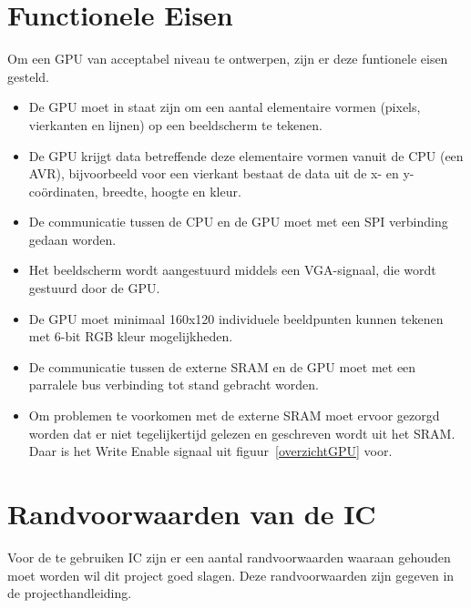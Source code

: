 \documentclass{scrartcl} %
\begin{document}
\section {Functionele Eisen}
Om een GPU van acceptabel niveau te ontwerpen, zijn er deze funtionele eisen gesteld.
\begin {itemize}
\item De GPU moet in staat zijn om een aantal elementaire vormen (pixels, vierkanten en lijnen) op een beeldscherm te tekenen.
\item De GPU krijgt data betreffende deze elementaire vormen vanuit de CPU (een AVR), bijvoorbeeld voor een vierkant bestaat de data uit de x- en y-coördinaten, breedte, hoogte en kleur.
\item De communicatie tussen de CPU en de GPU moet met een SPI verbinding gedaan worden.
\item Het beeldscherm wordt aangestuurd middels een VGA-signaal, die wordt gestuurd door de GPU.
\item De GPU moet minimaal 160x120 individuele beeldpunten kunnen tekenen met 6-bit RGB kleur mogelijkheden.
\item De communicatie tussen de externe SRAM en de GPU moet met een parralele bus verbinding tot stand gebracht worden.
\item Om problemen te voorkomen met de externe SRAM moet ervoor gezorgd worden dat er niet tegelijkertijd gelezen en geschreven wordt uit het SRAM. Daar is het Write Enable signaal uit figuur~\ref{overzichtGPU} voor.
\end{itemize}

\section {Randvoorwaarden van de IC}

Voor de te gebruiken IC zijn er een aantal randvoorwaarden waaraan gehouden moet worden wil dit project goed slagen. Deze randvoorwaarden zijn gegeven in de projecthandleiding\cite {epo3-manual}.
\end{document}
